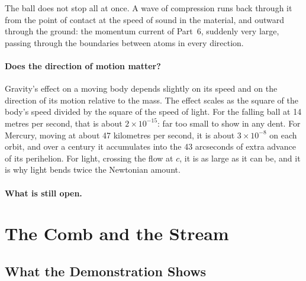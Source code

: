 \documentclass[11pt,a4paper]{article}
\begin{document}
 The ball does not stop all at once. A wave of compression runs back through it from the point of contact at the speed of sound in the material, and outward through the ground: the momentum current of Part~6, suddenly very large, passing through the boundaries between atoms in every direction. 

\paragraph{Does the direction of motion matter?} Gravity's effect on a moving body depends slightly on its speed and on the direction of its motion relative to the mass. The effect scales as the square of the body's speed divided by the square of the speed of light. For the falling ball at 14 metres per second, that is about $2\times10^{-15}$: far too small to show in any dent. For Mercury, moving at about 47 kilometres per second, it is about $3\times10^{-8}$ on each orbit, and over a century it accumulates into the 43 arcseconds of extra advance of its perihelion. For light, crossing the flow at $c$, it is as large as it can be, and it is why light bends twice the Newtonian amount. 

\paragraph{What is still open.} 

\FloatBarrier
\section{The Comb and the Stream}
\label{sec:comb}

\subsection*{What the Demonstration Shows}
\end{document}
